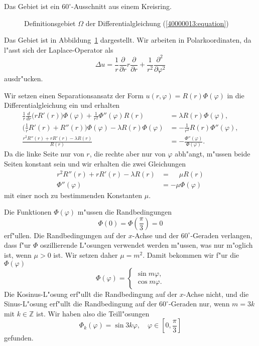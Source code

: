 \begin{loesung}
Das Gebiet ist ein $60^\circ$-Ausschnitt aus einem Kreisring.

\begin{figure}
\centering
{}
\caption{Definitionsgebiet $\Omega$ der Differentialgleichung
(\ref{40000013:equation})
\label{40000013:gebiet}
}
\end{figure}
Das Gebiet ist in Abbildung~\ref{40000013:gebiet} dargestellt.
Wir arbeiten in Polarkoordinaten, da l"asst sich der Laplace-Operator als
\[
\Delta u
=
\frac1r\frac{\partial}{\partial r}r\frac{\partial}{\partial r}
+
\frac1{r^2}
\frac{\partial^2}{\partial\varphi^2}
\]
ausdr"ucken.
\begin{teilaufgaben}
\item
Wir setzen einen Separationsansatz der Form $u(r,\varphi)=R(r)\Phi(\varphi)$
in die Differentialgleichung ein und erhalten
\begin{align*}
\frac1r\frac{d}{dr}\bigl(rR'(r)\bigr)\Phi(\varphi)
+
\frac1{r^2}
\Phi''(\varphi)R(r)
&=
\lambda R(r)\Phi(\varphi),
\\
\biggl(\frac1rR'(r)+R''(r)\biggr)\Phi(\varphi)
- \lambda R(r)\Phi(\varphi)
&=
-
\frac1{r^2}
R(r)\Phi''(\varphi),
\\
\frac{r^2R''(r)+rR'(r)-\lambda R(r)}{R(r)}
&=
-\frac{\Phi''(\varphi)}{\Phi(\varphi)}.
\end{align*}
Da die linke Seite nur von $r$, die rechte aber nur von $\varphi$ abh"angt,
m"ussen beide Seiten konstant sein und wir
erhalten die zwei Gleichungen
\begin{align}
r^2R''(r)+rR'(r)-\lambda R(r)&=\phantom{-}\mu R(r)
\label{40000013:erste}
\\
\Phi''(\varphi)&=-\mu\Phi(\varphi)
\label{40000013:zweite}
\end{align}
mit einer noch zu bestimmenden Konstanten $\mu$.
\item
Die Funktionen $\Phi(\varphi)$ m"ussen die Randbedingungen
\[
\Phi(0)=\Phi({\textstyle\frac{\pi}3})=0
\]
erf"ullen.
Die Randbedingungen auf der $x$-Achse und der $60^\circ$-Geraden verlangen,
dass f"ur $\Phi$
oszillierende L"osungen verwendet werden m"ussen, was nur m"oglich ist,
wenn $\mu>0$ ist. Wir setzen daher $\mu=m^2$. Damit bekommen wir f"ur die
$\Phi(\varphi)$
\[
\Phi(\varphi)=\begin{cases}\sin m\varphi,\\\cos m\varphi.\end{cases}
\]
Die Kosinus-L"osung erf"ullt die Randbedingung auf der $x$-Achse nicht,
und die Sinus-L"osung erf"ullt die Randbedingung auf der $60^\circ$-Geraden nur,
wenn $m=3k$ mit $k\in\mathbb Z$ ist.
Wir haben also die Teill"osungen
\[
\Phi_k(\varphi)=\sin 3k\varphi, \quad\varphi\in[0,{\textstyle \frac{\pi}3}]
\]
gefunden.


\end{teilaufgaben}
\end{loesung}
